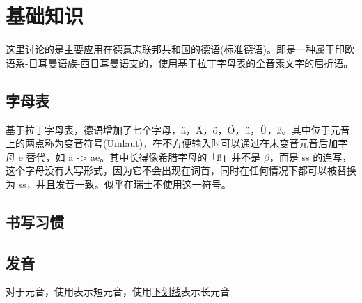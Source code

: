 \section{基础知识}

这里讨论的是主要应用在德意志联邦共和国的德语(标准德语)。即是一种属于印欧语系-日耳曼语族-西日耳曼语支的，使用基于拉丁字母表的全音素文字的屈折语。


\subsection{字母表}

基于拉丁字母表，德语增加了七个字母，ä，Ä，ö，Ö，ü，Ü，ß。其中位于元音上的两点称为变音符号(Umlaut)，在不方便输入时可以通过在未变音元音后加字母 e 替代，如 ä -> ae。其中长得像希腊字母的「ß」并不是 $\beta$，而是 ss 的连写，这个字母没有大写形式，因为它不会出现在词首，同时在任何情况下都可以被替换为 ss，并且发音一致。似乎在瑞士不使用这一符号。

\subsection{书写习惯}
\subsection{发音}
对于元音，使用表示短元音，使用\uline{下划线}表示长元音

